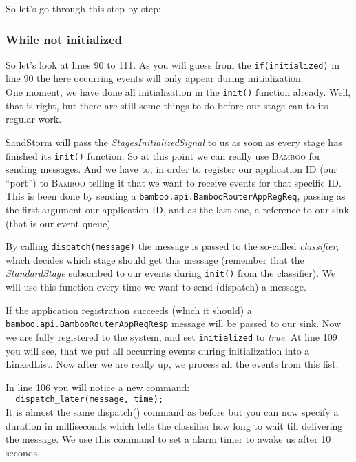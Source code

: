 \documentclass[twocolumn, twoside, a4paper]{article}
\begin{document}
So let's go through this step by step:


\subsubsection{While not initialized}
\label{sec:handleevent:sec:preinit}


So let's look at lines 90 to 111. As you will guess from the
\texttt{if(initialized)} in line 90 the here occurring events will
only appear during initialization.\\
One moment, we have done all initialization in the \texttt{init()}
function already. Well, that is right, but there are still some things
to do before our stage can to its regular work.

SandStorm will pass the
\emph{StagesInitializedSignal} to us as soon as
every stage has finished its \texttt{init()} function. So at this
point we can really use \textsc{Bamboo} for sending messages. And we have to, in
order to register our application ID (our ``port'') to \textsc{Bamboo} telling
it that we want to receive events for that specific ID. This is been
done by sending a \texttt{bamboo.api.BambooRouterAppRegReq}, passing
as the first argument our application ID, and as the last one, a
reference to our sink (that is our event queue).

By calling \texttt{dispatch(message)} the message is passed to the
so-called \emph{classifier}, which decides which stage should get this 
message (remember that the \emph{StandardStage} subscribed to our events
during \texttt{init()} from the classifier). We will use this function
every time we want to send (dispatch) a message.

If the application registration succeeds (which it should) a
\texttt{bamboo.api.BambooRouterAppReqResp} message will be passed to
our sink. Now we are fully registered to the system, and set
\texttt{initialized} to \emph{true}. At line 109 you will see, that we put all
occurring events during initialization into a LinkedList. Now after we
are really up, we process all the events from this list.

In line 106 you will notice a new command:\\
\lstinline$  dispatch_later(message, time);$\\
It is almost the same dispatch() command as before but you can now
specify a duration in milliseconds which tells the classifier how long
to wait till delivering the message. We use this command to set a
alarm timer to awake us after 10 seconds.
\end{document}
